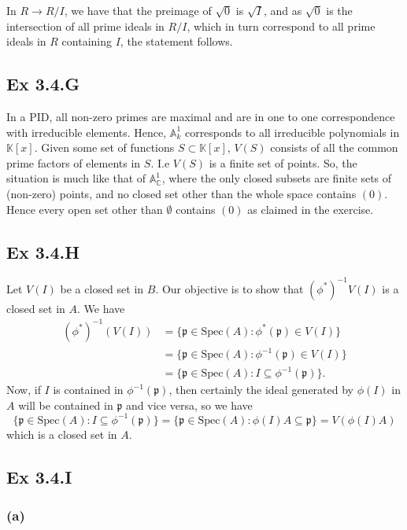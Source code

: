 \documentclass{article}
\theoremstyle{definition}
\newcommand{\C}{\mathbb{C}}
\newcommand{\K}{\mathbb{K}}
\newcommand{\A}{\mathbb{A}}
\newcommand{\Spec}{\text{Spec}}
\newcommand{\spec}{\Spec}
\begin{document}
In $R \to R/I$, we have that the preimage of $\sqrt{0}$ is $\sqrt{I}$, and as
$\sqrt{0}$ is the intersection of all prime ideals in $R/I$, which in turn
correspond to all prime ideals in $R$ containing $I$, the statement follows.

\subsection*{Ex 3.4.G}

In a PID, all non-zero primes are maximal and are in one to one correspondence
with irreducible elements. Hence, $\A^1_k$ corresponds to all irreducible
polynomials in $\K[x]$. Given some set of functions $S \subset \K[x]$, $V(S)$
consists of all the common prime factors of elements in $S$. I.e $V(S)$ is a
finite set of points. So, the situation is much like that of $\A^1_{\C}$, where
the only closed subsets are finite sets of (non-zero) points, and no closed set
other than the whole space contains $(0)$. Hence every open set other than
$\emptyset$ contains $(0)$ as claimed in the exercise.

\subsection*{Ex 3.4.H}

Let $V(I)$ be a closed set in $B$. Our objective is to show that
$(\phi^*)^{-1}V(I)$ is a closed set in $A$. We have
\begin{align*}
	(\phi^*)^{-1}(V(I))
	&=
	\{
		\mathfrak{p} \in \spec(A) : \phi^*(\mathfrak{p}) \in V(I)
	\} \\
	&=
	\{
		\mathfrak{p} \in \spec(A) : \phi^{-1}(\mathfrak{p}) \in V(I)
	\} \\
	&=
	\{
		\mathfrak{p} \in \spec(A) : I \subseteq \phi^{-1}(\mathfrak{p})
	\}.
\end{align*}
Now, if $I$ is contained in $\phi^{-1}(\mathfrak{p})$, then certainly the ideal 
generated by $\phi(I)$ in $A$ will be contained in $\mathfrak{p}$ and vice versa, 
so we have
\[
	\{
		\mathfrak{p} \in \spec(A) : I \subseteq \phi^{-1}(\mathfrak{p})
	\} 
	=
	\{
		\mathfrak{p} \in \spec(A) : \phi(I)A \subseteq \mathfrak{p}
	\} 
	=
	V(\phi(I)A)
\] 
which is a closed set in $A$.

\subsection*{Ex 3.4.I}

\subsubsection*{(a)}
\end{document}
